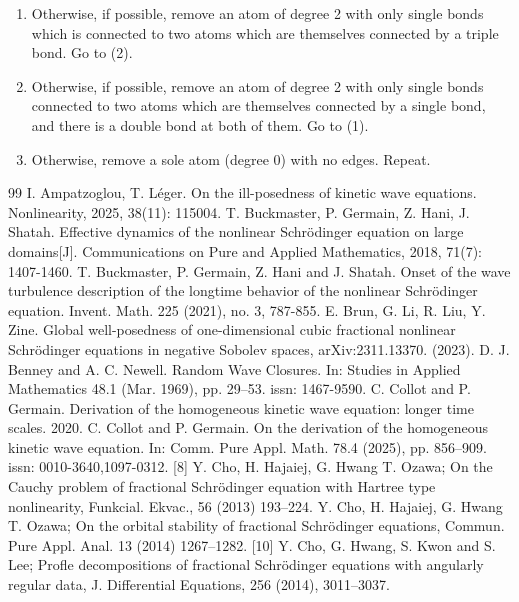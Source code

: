 \documentclass[UTF-8,reqno]{amsart}
\numberwithin{equation}{section}
\theoremstyle{definition}
\begin{document}
\begin{enumerate}
 \item  Otherwise, if possible, remove an atom of degree 2 with only single bonds which is  connected to two atoms which are themselves connected by a triple bond. Go to (2).
 \item  Otherwise, if possible, remove an atom of degree 2 with only single bonds connected  to two atoms which are themselves connected by a single bond, and there is a double bond at both of them. Go to (1).
 \item  Otherwise, remove a sole atom (degree 0) with no edges. Repeat.
 \end{enumerate}
 

\begin{thebibliography}{99}
I. Ampatzoglou, T. L\'eger. On the ill-posedness of kinetic wave equations. Nonlinearity, 2025, 38(11): 115004.
T. Buckmaster, P. Germain, Z. Hani, J. Shatah. Effective dynamics of the nonlinear Schrödinger equation on large domains[J]. Communications on Pure and Applied Mathematics, 2018, 71(7): 1407-1460.
T. Buckmaster, P. Germain, Z. Hani and J. Shatah. Onset of the wave turbulence description
of the longtime behavior of the nonlinear Schr\"odinger equation. Invent. Math. 225 (2021),
no. 3, 787-855.
E. Brun, G. Li, R. Liu, Y. Zine. Global well-posedness of one-dimensional cubic fractional nonlinear
Schr\"odinger equations in negative Sobolev spaces, arXiv:2311.13370. (2023).
D. J. Benney and A. C. Newell. Random Wave Closures. In: Studies in Applied Mathematics 48.1
 (Mar. 1969), pp. 29–53. issn: 1467-9590.
 C. Collot and P. Germain. Derivation of the homogeneous kinetic wave equation: longer time
 scales. 2020.  
 C. Collot and P. Germain.  On the derivation of the homogeneous kinetic wave equation.
 In: Comm. Pure Appl. Math. 78.4 (2025), pp. 856–909. issn: 0010-3640,1097-0312.  
[8] Y. Cho, H. Hajaiej, G. Hwang T. Ozawa; On the Cauchy problem of fractional Schr\"odinger equation with
Hartree type nonlinearity, Funkcial. Ekvac., 56 (2013) 193–224.
 Y. Cho, H. Hajaiej, G. Hwang T. Ozawa; On the orbital stability of fractional Schr\"odinger equations,
Commun. Pure Appl. Anal. 13 (2014) 1267–1282.
[10] Y. Cho, G. Hwang, S. Kwon and S. Lee; Profle decompositions of fractional Schr\"odinger equations with
angularly regular data, J. Differential Equations, 256 (2014), 3011–3037.

\end{thebibliography}
\end{document}
